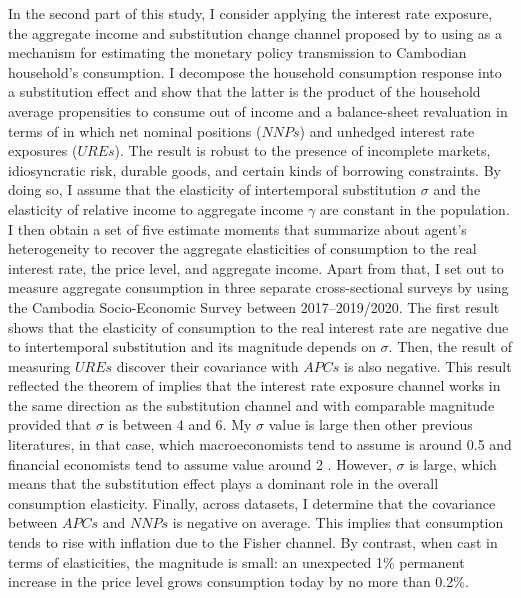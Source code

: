 \documentclass[11pt,letterpaper]{article}
\begin{document}
In the second part of this study, I consider applying the interest rate exposure, the aggregate income and substitution change channel proposed by \citet{Auclert2019} to using as a mechanism for estimating the monetary policy transmission to Cambodian household's consumption. I decompose the household consumption response into a substitution effect and show that the latter is the product of the household average propensities to consume out of income and a balance-sheet revaluation in terms of in which net nominal positions ($NNPs$) and unhedged interest rate exposures ($UREs$). The result is robust to the presence of incomplete markets, idiosyncratic risk, durable goods, and certain kinds of borrowing constraints. By doing so, I assume that the elasticity of intertemporal substitution $\sigma$ and the elasticity of relative income to aggregate income $\gamma$ are constant in the population. I then obtain a set of five estimate moments that summarize about agent's heterogeneity to recover the aggregate elasticities of consumption to the real interest rate, the price level, and aggregate income. Apart from that, I set out to measure aggregate consumption in three separate cross-sectional surveys by using the Cambodia Socio-Economic Survey between 2017--2019/2020. The first result shows that the elasticity of consumption to the real interest rate are negative due to intertemporal substitution and its magnitude depends on $\sigma$. Then,  the result of measuring $UREs$ discover their covariance with $APCs$ is also negative. This result reflected the theorem of \citet{Auclert2019} implies that the interest rate exposure channel works in the same direction as the substitution channel and with comparable magnitude provided that $\sigma$ is between 4 and 6. My $\sigma$ value is large then other previous literatures, in that case, which macroeconomists tend to assume is around 0.5 \cite{Havranek2015} and financial economists tend to assume value around 2 \cite{Bansal2016}. However, $\sigma$ is large, which means that the substitution effect plays a dominant role in the overall consumption elasticity. Finally, across datasets, I determine that the covariance between $APCs$ and $NNPs$ is negative on average. This implies that consumption tends to rise with inflation due to the Fisher channel. By contrast, when cast in terms of elasticities, the magnitude is small: an unexpected 1\% permanent increase in the price level grows consumption today by no more than 0.2\%. 
\end{document}
